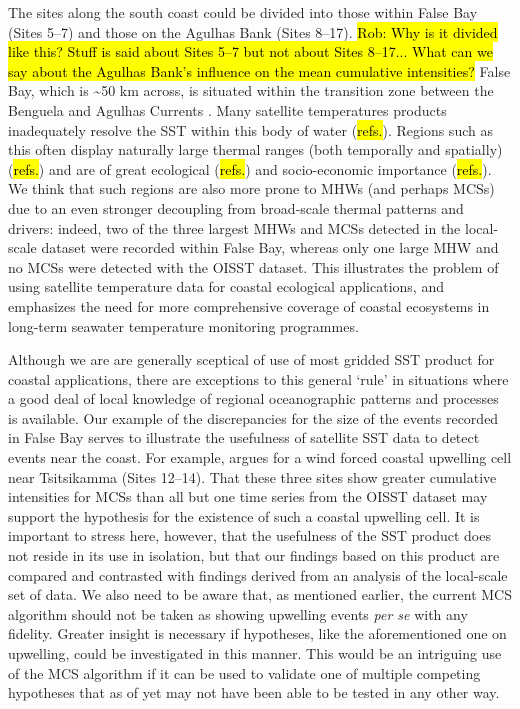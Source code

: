 \documentclass[a4paper,10pt,review]{elsarticle}
\begin{document}
The sites along the south coast could be divided into those within False Bay (Sites 5--7) and those on the Agulhas Bank (Sites 8--17). \hl{Rob: Why is it divided like this? Stuff is said about Sites 5--7 but not about Sites 8--17... What can we say about the Agulhas Bank's influence on the mean cumulative intensities?} False Bay, which is \textasciitilde50 km across, is situated within the transition zone between the Benguela and Agulhas Currents \citep{Smit2013}. Many satellite temperatures products inadequately resolve the SST within this body of water (\hl{refs.}). Regions such as this often display naturally large thermal ranges (both temporally and spatially) (\hl{refs.}) and are of great ecological (\hl{refs.}) and socio-economic importance (\hl{refs.}). We think that such regions are also more prone to MHWs (and perhaps MCSs) due to an even stronger decoupling from broad-scale thermal patterns and drivers: indeed, two of the three largest MHWs and MCSs detected in the local-scale dataset were recorded within False Bay, whereas only one large MHW and no MCSs were detected with the OISST dataset. This illustrates the problem of using satellite temperature data for coastal ecological applications, and emphasizes the need for more comprehensive coverage of coastal ecosystems in long-term seawater temperature monitoring programmes.

Although we are are generally sceptical of use of most gridded SST product for coastal applications, there are exceptions to this general `rule' in situations where a good deal of local knowledge of regional oceanographic patterns and processes is available. Our example of the discrepancies for the size of the events recorded in False Bay serves to illustrate the usefulness of satellite SST data to detect events near the coast. For example, \citet{Roberts2005} argues for a wind forced coastal upwelling cell near Tsitsikamma (Sites 12--14). That these three sites show greater cumulative intensities for MCSs than all but one time series from the OISST dataset may support the hypothesis for the existence of such a coastal upwelling cell. It is important to stress here, however, that the usefulness of the SST product does not reside in its use in isolation, but that our findings based on this product are compared and contrasted with findings derived from an analysis of the local-scale set of data. We also need to be aware that, as mentioned earlier, the current MCS algorithm should not be taken as showing upwelling events \emph{per se} with any fidelity. Greater insight is necessary if hypotheses, like the aforementioned one on upwelling, could be investigated in this manner. This would be an intriguing use of the MCS algorithm if it can be used to validate one of multiple competing hypotheses that as of yet may not have been able to be tested in any other way.
\end{document}
